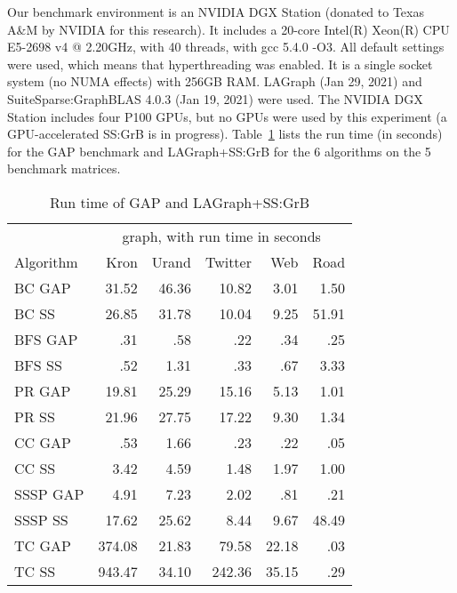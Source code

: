 Our benchmark environment is an NVIDIA DGX Station (donated to Texas A\&M by
NVIDIA for this research).  It includes a 20-core Intel(R) Xeon(R) CPU E5-2698
v4 @ 2.20GHz, with 40 threads, with gcc 5.4.0 -O3.  All default settings were
used, which means that hyperthreading was enabled.  It is a single socket
system (no NUMA effects) with 256GB RAM.  LAGraph (Jan 29, 2021) and
SuiteSparse:GraphBLAS 4.0.3 (Jan 19, 2021) were used.
The NVIDIA DGX Station includes four P100 GPUs, but no GPUs were used by
this experiment (a GPU-accelerated SS:GrB is in progress).
Table~\ref{table:results} lists the run time (in seconds) for the GAP benchmark
and LAGraph+SS:GrB for the 6 algorithms on the 5 benchmark matrices.

\begin{table}
\begin{center}
\begin{tabular}{|l|rrrrr|}
\hline
             &   \multicolumn{5}{c|}{graph, with run time in seconds}  \\
Algorithm    &   Kron    &   Urand   &   Twitter  &  Web    &    Road  \\
\hline
BC   GAP     &  31.52    &  46.36    &  10.82     &  3.01   &    1.50  \\
BC   SS      &  26.85    &  31.78    &  10.04     &  9.25   &   51.91  \\
\hline
BFS  GAP     &    .31    &    .58    &    .22     &   .34   &     .25  \\
BFS  SS      &    .52    &   1.31    &    .33     &   .67   &    3.33  \\
\hline
PR   GAP     &  19.81    &  25.29    &  15.16     &  5.13   &    1.01  \\
PR   SS      &  21.96    &  27.75    &  17.22     &  9.30   &    1.34  \\
\hline
CC   GAP     &    .53    &   1.66    &    .23     &   .22   &     .05  \\
CC   SS      &   3.42    &   4.59    &   1.48     &  1.97   &    1.00  \\
\hline
SSSP GAP     &   4.91    &   7.23    &   2.02     &   .81   &     .21  \\
SSSP SS      &  17.62    &  25.62    &   8.44     &  9.67   &   48.49  \\
\hline
TC GAP       & 374.08    &  21.83    &  79.58     & 22.18   &     .03  \\
TC SS        & 943.47    &  34.10    & 242.36     & 35.15   &     .29  \\
\hline
\end{tabular}
\caption{Run time of GAP and LAGraph+SS:GrB
\label{table:results}}
\end{center}
\end{table}

